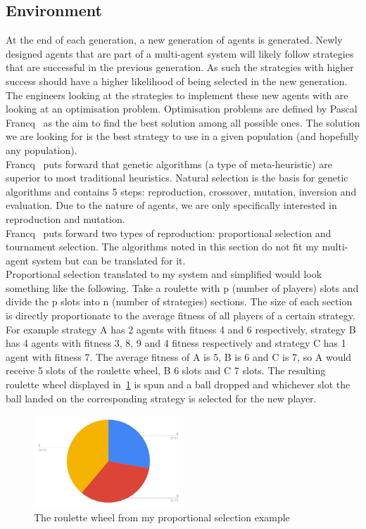 \documentclass[]{final_report}
\begin{document}
\subsection{Environment}
At the end of each generation, a new generation of agents is generated. Newly designed agents that are part of a multi-agent system will likely follow strategies that are successful in the previous generation. As such the strategies with higher success should have a higher likelihood of being selected in the new generation.\\
The engineers looking at the strategies to implement these new agents with are looking at an optimisation problem. Optimisation problems are defined by Pascal Francq~\cite{optimisation_problems} as the aim to find the best solution among all possible ones. The solution we are looking for is the best strategy to use in a given population (and hopefully any population).\\
Francq~\cite{optimisation_problems} puts forward that genetic algorithms (a type of meta-heuristic) are superior to most traditional heuristics. Natural selection is the basis for genetic algorithms and contains 5 steps: reproduction, crossover, mutation, inversion and evaluation. Due to the nature of agents, we are only specifically interested in reproduction and mutation.\\
Francq~\cite{genetic_algorithms} puts forward two types of reproduction: proportional selection and tournament selection. The algorithms noted in this section do not fit my multi-agent system but can be translated for it.\\
Proportional selection translated to my system and simplified would look something like the following. Take a roulette with p (number of players) slots and divide the p slots into n (number of strategies) sections. The size of each section is directly proportionate to the average fitness of all players of a certain strategy. For example strategy A has 2 agents with fitness 4 and 6 respectively, strategy B has 4 agents with fitness 3, 8, 9 and 4 fitness respectively and strategy C has 1 agent with fitness 7. The average fitness of A is 5, B is 6 and C is 7, so A would receive 5 slots of the roulette wheel, B 6 slots and C 7 slots. The resulting roulette wheel displayed in~\ref{fig:roulette_wheel} is spun and a ball dropped and whichever slot the ball landed on the corresponding strategy is selected for the new player.\\
\begin{figure}
	\begin{center}
	\includegraphics[width=0.5\textwidth]{chart.png}
	\caption{The roulette wheel from my proportional selection example}
	\label{fig:roulette_wheel}
	\end{center}
\end{figure}
\end{document}
